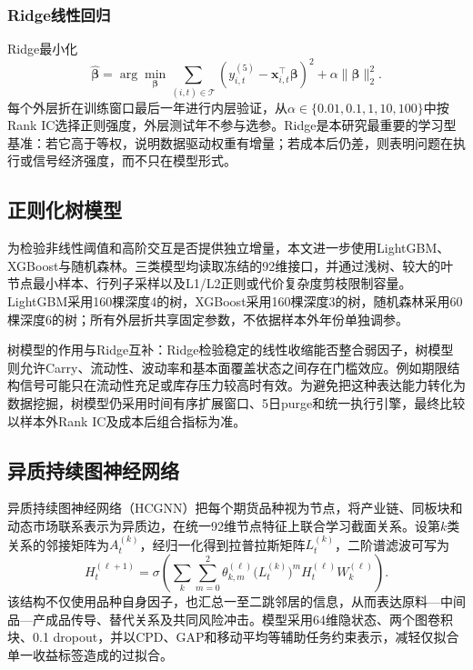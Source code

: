 \documentclass[UTF8,zihao=-4,fontset=ubuntu]{ctexart}
\begin{document}
\subsubsection{Ridge线性回归}

Ridge最小化
\begin{equation}
\widehat{\bm\beta}=\arg\min_{\bm\beta}\sum_{(i,t)\in\mathcal T}\left(y_{i,t}^{(5)}-\bm x_{i,t}^{\top}\bm\beta\right)^2+\alpha\lVert\bm\beta\rVert_2^2.
\end{equation}
每个外层折在训练窗口最后一年进行内层验证，从\(\alpha\in\{0.01,0.1,1,10,100\}\)中按Rank IC选择正则强度，外层测试年不参与选参。Ridge是本研究最重要的学习型基准：若它高于等权，说明数据驱动权重有增量；若成本后仍差，则表明问题在执行或信号经济强度，而不只在模型形式。

\subsection{正则化树模型}

为检验非线性阈值和高阶交互是否提供独立增量，本文进一步使用LightGBM、XGBoost与随机森林。三类模型均读取冻结的92维接口，并通过浅树、较大的叶节点最小样本、行列子采样以及L1/L2正则或代价复杂度剪枝限制容量。LightGBM采用160棵深度4的树，XGBoost采用160棵深度3的树，随机森林采用60棵深度6的树；所有外层折共享固定参数，不依据样本外年份单独调参。

树模型的作用与Ridge互补：Ridge检验稳定的线性收缩能否整合弱因子，树模型则允许Carry、流动性、波动率和基本面覆盖状态之间存在门槛效应。例如期限结构信号可能只在流动性充足或库存压力较高时有效。为避免把这种表达能力转化为数据挖掘，树模型仍采用时间有序扩展窗口、5日purge和统一执行引擎，最终比较以样本外Rank IC及成本后组合指标为准。

\subsection{异质持续图神经网络}

异质持续图神经网络（HCGNN）把每个期货品种视为节点，将产业链、同板块和动态市场联系表示为异质边，在统一92维节点特征上联合学习截面关系。设第$k$类关系的邻接矩阵为$A_t^{(k)}$，经归一化得到拉普拉斯矩阵$L_t^{(k)}$，二阶谱滤波可写为
\begin{equation}
H_{t}^{(\ell+1)}=\sigma\!\left(\sum_k\sum_{m=0}^{2}\theta_{k,m}^{(\ell)}\bigl(L_t^{(k)}\bigr)^m H_t^{(\ell)}W_k^{(\ell)}\right).
\end{equation}
该结构不仅使用品种自身因子，也汇总一至二跳邻居的信息，从而表达原料—中间品—产成品传导、替代关系及共同风险冲击。模型采用64维隐状态、两个图卷积块、0.1 dropout，并以CPD、GAP和移动平均等辅助任务约束表示，减轻仅拟合单一收益标签造成的过拟合。
\end{document}

